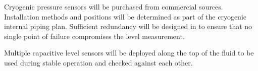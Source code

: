 Cryogenic pressure sensors will be purchased from commercial sources.
Installation methods and positions will be determined as part of the
cryogenic internal piping plan.  Sufficient redundancy will be designed in
to ensure that no single point of failure compromises the level measurement.

Multiple capacitive level sensors will be deployed along the top of
the fluid to be used during stable operation and checked against each
other.

